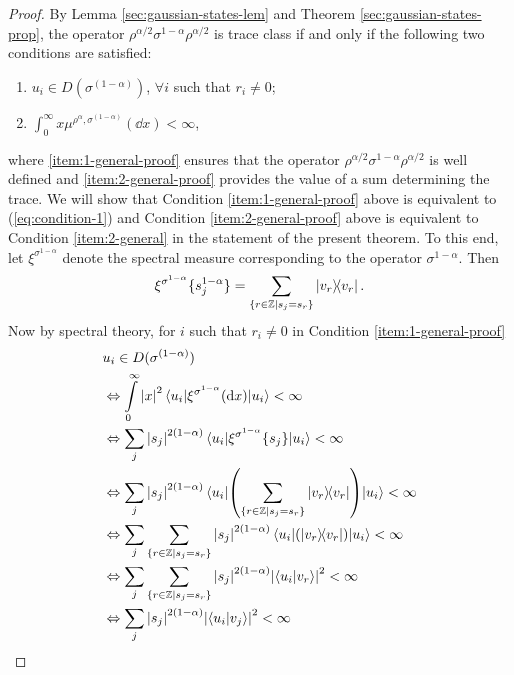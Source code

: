 \documentclass[12pt,a4paper,oneside]{article}
\numberwithin{equation}{section}
\theoremstyle{definition}  %
\theoremstyle{plain}  %
\theoremstyle{remark} %
\newcommand{\BZ}{\mathbb{Z}}
\begin{document}
\begin{proof}
By Lemma \ref{sec:gaussian-states-lem} and Theorem \ref{sec:gaussian-states-prop}, the operator $\rho^{\alpha/2}\sigma^{1-\alpha}\rho^{\alpha/2}$ is trace class if and only if the following two conditions are satisfied: 
\begin{enumerate}[label=(\roman*)]
    \item \label{item:1-general-proof} $u_i\in D(\sigma^{(1-\alpha)})$, $\forall i $ such that $r_i\neq 0$;
    \item \label{item:2-general-proof} $\int_0^\infty x\mu^{\rho^\alpha,\sigma^{(1-\alpha)}}(\dd x)<\infty$,
\end{enumerate}
where \ref{item:1-general-proof} ensures that the operator $\rho^{\alpha/2}\sigma^{1-\alpha}\rho^{\alpha/2}$ is well defined and \ref{item:2-general-proof} provides the value of a sum determining the trace. We will show that Condition \ref{item:1-general-proof} above is equivalent to (\ref{eq:condition-1})   and Condition \ref{item:2-general-proof} above is equivalent to  Condition \ref{item:2-general} in the statement of the present theorem. To this end, let $\xi^{\sigma^{1-\alpha}}$ denote the spectral measure corresponding to the operator $\sigma^{1-\alpha}$. Then \begin{align}
    \label{eq:spectral-measure-sigma}
\xi^{\sigma^{1-\alpha}}\{s_j^{1-\alpha}\} = \sum\limits_{\{r\in \BZ|s_j=s_r\}}\ketbra{v_r}.
\end{align} Now by spectral theory, for $i$ such that $r_i\neq 0$ in Condition \ref{item:1-general-proof} \begin{align*}
   &  u_i\in D(\sigma^{(1-\alpha)})\\
   & \Leftrightarrow \int\limits_0^\infty \abs{x}^2\mel{u_i}{\xi^{\sigma^{1-\alpha}}(\dd x)}{u_i}<\infty\quad \\
   & \Leftrightarrow \sum\limits_{j} \abs{s_j}^{2(1-\alpha)}\mel{u_i}{\xi^{\sigma^{1-\alpha}}\{s_j\}}{u_i}<\infty \\
 & \Leftrightarrow \sum\limits_{j} \abs{s_j}^{2(1-\alpha)}\mel{u_i}{\left(\sum\limits_{\{r\in \BZ|s_j=s_r\}}\ketbra{v_r}\right)}{u_i}<\infty\\
 & \Leftrightarrow \sum\limits_{j}\sum\limits_{\{r\in \BZ|s_j=s_r\}} \abs{s_j}^{2(1-\alpha)}\mel{u_i}{\left(\ketbra{v_r}\right)}{u_i}<\infty\\
 & \Leftrightarrow \sum\limits_{j}\sum\limits_{\{r\in \BZ|s_j=s_r\}} \abs{s_j}^{2(1-\alpha)}\abs{\braket{u_i}{v_r}}^2<\infty\\
 & \Leftrightarrow \sum\limits_{j} \abs{s_j}^{2(1-\alpha)}\abs{\braket{u_i}{v_j}}^2<\infty

\end{align*}
\end{proof}
\end{document}
